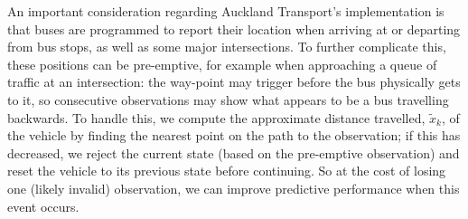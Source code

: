 An important consideration regarding Auckland Transport's \rt implementation is that
buses are programmed to report their location when arriving at or departing from
bus stops, as well as some major intersections.
To further complicate this,
these positions can be pre-emptive,
for example when approaching a queue of traffic at an intersection:
the way-point may trigger before the bus physically gets to it,
so consecutive observations may show what appears to be a bus travelling backwards.
To handle this, we compute the approximate distance travelled, $\tilde x_k$,
of the vehicle by finding the nearest point on the path to the observation;
if this has decreased, we reject the current state (based on the pre-emptive observation)
and reset the vehicle
to its previous state before continuing.
So at the cost of losing one (likely invalid) observation,
we can improve predictive performance
when this event occurs.
